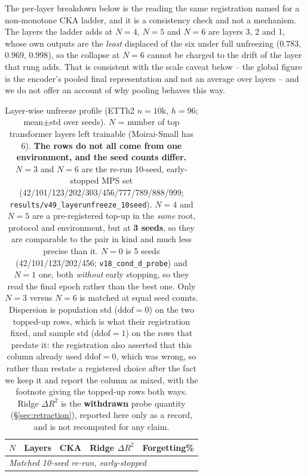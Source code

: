 The per-layer breakdown below is the reading the same registration named for a
non-monotone CKA ladder, and it is a consistency check and not a mechanism.  The
layers the ladder adds at $N{=}4$, $N{=}5$ and $N{=}6$ are layers 3, 2 and 1,
whose own outputs are the \emph{least} displaced of the six under full unfreezing
($0.783$, $0.969$, $0.998$), so the collapse at $N{=}6$ cannot be charged to the
drift of the layer that rung adds.  That is consistent with the scale caveat below
-- the global figure is the encoder's pooled final representation and not an
average over layers -- and we do not offer an account of why pooling behaves this
way.

\begin{table}[!ht]
\centering
\vspace{-4pt}
\caption{Layer-wise unfreeze profile (ETTh2 $n{=}10$k, $h{=}96$; mean$\pm$std over
seeds).  $N$ = number of top transformer layers left trainable (Moirai-Small has
6).  \textbf{The rows do not all come from one environment, and the seed counts
differ.}  $N{=}3$ and $N{=}6$ are the re-run 10-seed, early-stopped MPS set
(42/101/123/202/303/456/777/789/888/999;
\texttt{results/v49\_layerunfreeze\_10seed}).  $N{=}4$ and $N{=}5$ are a
pre-registered top-up in the \emph{same} root, protocol and environment, but at
\textbf{3 seeds}, so they are comparable to the pair in kind and much less precise
than it.  $N{=}0$ is 5 seeds (42/101/123/202/456;
\texttt{v18\_cond\_d\_probe}) and $N{=}1$ one, both \emph{without} early stopping,
so they read the final epoch rather than the best one.  Only $N{=}3$ versus
$N{=}6$ is matched at equal seed counts.  Dispersion is population std
($\mathrm{ddof}{=}0$) on the two topped-up rows, which is what their registration
fixed, and sample std ($\mathrm{ddof}{=}1$) on the rows that predate it: the
registration also asserted that this column already used $\mathrm{ddof}{=}0$,
which was wrong, so rather than restate a registered choice after the fact we keep
it and report the column as mixed, with the footnote giving the topped-up rows
both ways.  Ridge $\Delta R^2$ is the \textbf{withdrawn} probe quantity
(\S\ref{sec:retraction}), reported here only as a record, and is not recomputed
for any claim.}
\label{tab:layerunfreeze}
\small
\setlength{\tabcolsep}{4pt}
\begin{tabular}{lcccc}
\toprule
$N$ & Layers & CKA & Ridge $\Delta R^2$ & Forgetting\% \\
\midrule
\multicolumn{5}{l}{\emph{Matched 10-seed re-run, early-stopped}} \\

\end{tabular}
\end{table}
